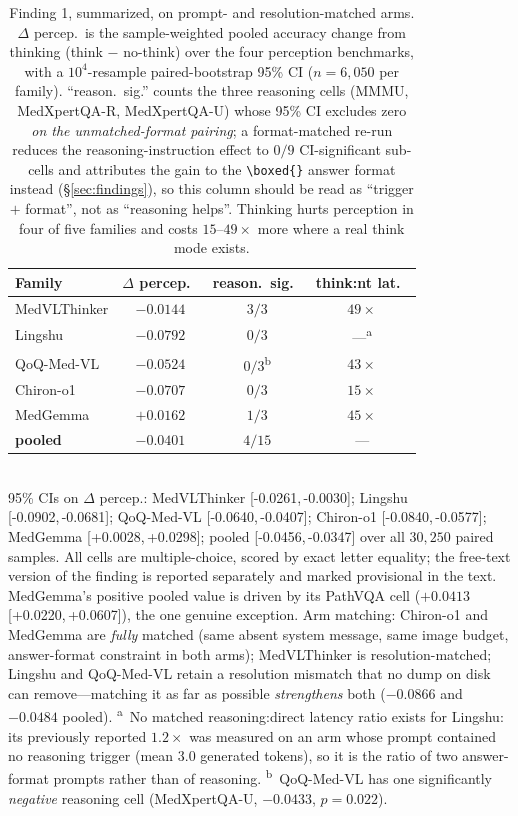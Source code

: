 \documentclass[conference]{IEEEtran}
\newcommand{\pval}[1]{\textsuperscript{#1}}
\newcommand{\ci}[2]{{\footnotesize[#1,\,#2]}}
\begin{document}
\begin{table}[t]
\centering
\caption{Finding 1, summarized, on prompt- and resolution-matched arms. $\Delta$ percep.\ is the sample-weighted pooled accuracy change from thinking (think $-$ no-think) over the four perception benchmarks, with a $10^4$-resample paired-bootstrap 95\% CI ($n{=}6{,}050$ per family). ``reason.\ sig.'' counts the three reasoning cells (MMMU, MedXpertQA-R, MedXpertQA-U) whose 95\% CI excludes zero \emph{on the unmatched-format pairing}; a format-matched re-run reduces the reasoning-instruction effect to $0/9$ CI-significant sub-cells and attributes the gain to the \texttt{\textbackslash boxed\{\}} answer format instead (\S\ref{sec:findings}), so this column should be read as ``trigger $+$ format'', not as ``reasoning helps''. Thinking hurts perception in four of five families and costs $15$--$49\times$ more where a real think mode exists.}
\label{tab:overthink}
\footnotesize
\setlength{\tabcolsep}{5pt}
\begin{tabular}{@{}lccc@{}}
\toprule
Family & $\Delta$ percep.\ & reason.\ sig.\ & think:nt lat.\ \\
\midrule
MedVLThinker & $-0.0144$ & $3/3$ & $49\times$ \\
Lingshu      & $-0.0792$ & $0/3$ & ---\pval{a} \\
QoQ-Med-VL   & $-0.0524$ & $0/3$\pval{b} & $43\times$ \\
Chiron-o1    & $-0.0707$ & $0/3$ & $15\times$ \\
MedGemma     & $+0.0162$ & $1/3$ & $45\times$ \\
\midrule
\textbf{pooled} & $\mathbf{-0.0401}$ & $4/15$ & --- \\
\bottomrule
\end{tabular}
\\[2pt]{\scriptsize 95\% CIs on $\Delta$ percep.: MedVLThinker \ci{-0.0261}{-0.0030}; Lingshu \ci{-0.0902}{-0.0681}; QoQ-Med-VL \ci{-0.0640}{-0.0407}; Chiron-o1 \ci{-0.0840}{-0.0577}; MedGemma \ci{+0.0028}{+0.0298}; pooled \ci{-0.0456}{-0.0347} over all $30{,}250$ paired samples. All cells are multiple-choice, scored by exact letter equality; the free-text version of the finding is reported separately and marked provisional in the text. MedGemma's positive pooled value is driven by its PathVQA cell ($+0.0413$ \ci{+0.0220}{+0.0607}), the one genuine exception. Arm matching: Chiron-o1 and MedGemma are \emph{fully} matched (same absent system message, same image budget, answer-format constraint in both arms); MedVLThinker is resolution-matched; Lingshu and QoQ-Med-VL retain a resolution mismatch that no dump on disk can remove---matching it as far as possible \emph{strengthens} both ($-0.0866$ and $-0.0484$ pooled). \pval{a}~No matched reasoning:direct latency ratio exists for Lingshu: its previously reported $1.2\times$ was measured on an arm whose prompt contained no reasoning trigger (mean $3.0$ generated tokens), so it is the ratio of two answer-format prompts rather than of reasoning. \pval{b}~QoQ-Med-VL has one significantly \emph{negative} reasoning cell (MedXpertQA-U, $-0.0433$, $p{=}0.022$).}
\end{table}
\end{document}

